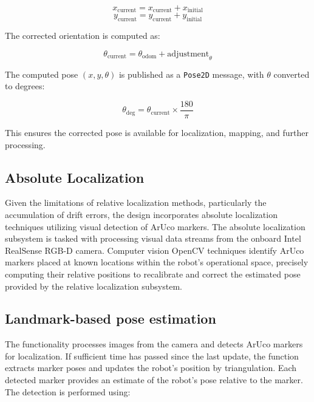 \documentclass{CSSRforAfrica}
\begin{document}
\begin{equation}
x_{\text{current}} = x_{\text{current}} + x_{\text{initial}}
\end{equation}
\begin{equation}
y_{\text{current}} = y_{\text{current}} + y_{\text{initial}}
\end{equation}

The corrected orientation is computed as:

\begin{equation}
\theta_{\text{current}} = \theta_{\text{odom}} + \text{adjustment}_\theta
\end{equation}

The computed pose \((x, y, \theta)\) is published as a \texttt{Pose2D} message, with \(\theta\) converted to degrees:

\begin{equation}
\theta_{\text{deg}} = \theta_{\text{current}} \times \frac{180}{\pi}
\end{equation}

This ensures the corrected pose is available for localization, mapping, and further processing.



\subsection{Absolute Localization}

Given the limitations of relative localization methods, particularly the accumulation of drift errors, the design incorporates absolute localization techniques utilizing visual detection of ArUco markers. The absolute localization subsystem is tasked with processing visual data streams from the onboard Intel RealSense RGB-D camera. Computer vision OpenCV techniques identify ArUco markers placed at known locations within the robot’s operational space, precisely computing their relative positions to recalibrate and correct the estimated pose provided by the relative localization subsystem.


\subsection*{Landmark-based pose estimation}

The functionality processes images from the camera and detects ArUco markers for localization. If sufficient time has passed since the last update, the function extracts marker poses and updates the robot's position by triangulation. Each detected marker provides an estimate of the robot's pose relative to the marker. The detection is performed using:
\end{document}
